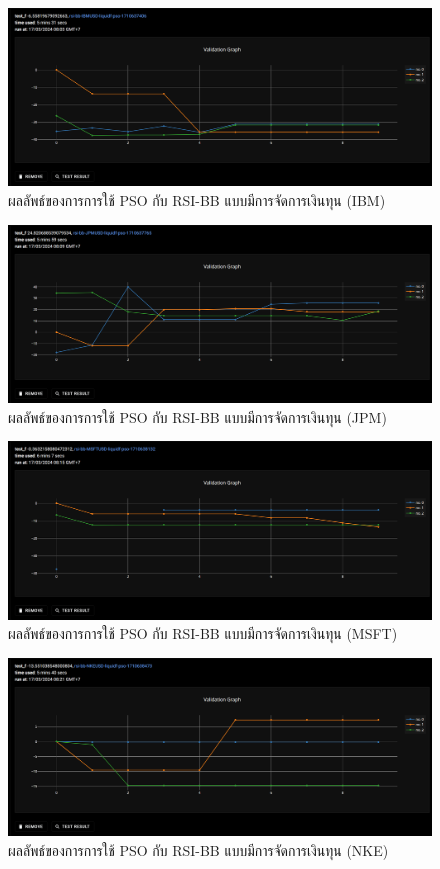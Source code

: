 \begin{figure}[ht]
    \centering
    \includegraphics[width=\textwidth]{images/pso/rsi-bb/ibm-liquid.png}
    \caption{ผลลัพธ์ของการการใช้ PSO กับ RSI-BB แบบมีการจัดการเงินทุน (IBM)}
\end{figure}
\begin{figure}[ht]
    \centering
    \includegraphics[width=\textwidth]{images/pso/rsi-bb/jpm-liquid.png}
    \caption{ผลลัพธ์ของการการใช้ PSO กับ RSI-BB แบบมีการจัดการเงินทุน (JPM)}
\end{figure}
\begin{figure}[ht]
    \centering
    \includegraphics[width=\textwidth]{images/pso/rsi-bb/msft-liquid.png}
    \caption{ผลลัพธ์ของการการใช้ PSO กับ RSI-BB แบบมีการจัดการเงินทุน (MSFT)}
\end{figure}
\begin{figure}[ht]
    \centering
    \includegraphics[width=\textwidth]{images/pso/rsi-bb/nke-liquid.png}
    \caption{ผลลัพธ์ของการการใช้ PSO กับ RSI-BB แบบมีการจัดการเงินทุน (NKE)}
\end{figure}
